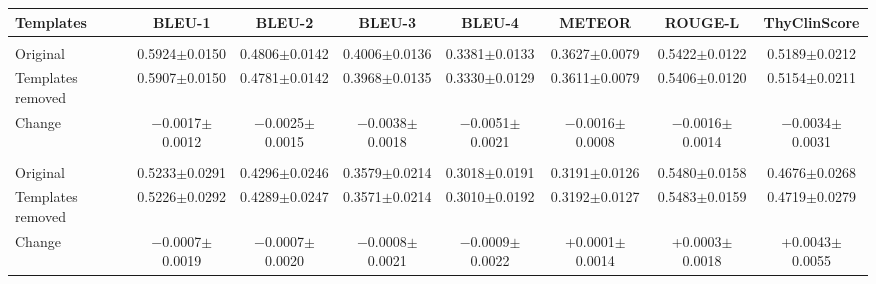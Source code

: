 \begin{responsetable}
\caption{}
\begin{adjustbox}{max width=\textwidth,center}
{\scriptsize\setlength{\tabcolsep}{3pt}
\begin{tabular}{@{}lccccccc@{}}
\toprule
\textbf{Templates} & \textbf{BLEU-1} & \textbf{BLEU-2} & \textbf{BLEU-3} & \textbf{BLEU-4} & \textbf{METEOR} & \textbf{ROUGE-L} & \textbf{ThyClinScore} \\
\midrule
\rowcolor{ResponseTableGray}\multicolumn{8}{c}{\textbf{SMU-HMC (n = 400)}} \\
Original & 0.5924$\pm$0.0150 & 0.4806$\pm$0.0142 & 0.4006$\pm$0.0136 & 0.3381$\pm$0.0133 & 0.3627$\pm$0.0079 & 0.5422$\pm$0.0122 & 0.5189$\pm$0.0212 \\
Templates removed & 0.5907$\pm$0.0150 & 0.4781$\pm$0.0142 & 0.3968$\pm$0.0135 & 0.3330$\pm$0.0129 & 0.3611$\pm$0.0079 & 0.5406$\pm$0.0120 & 0.5154$\pm$0.0211 \\
Change & $-$0.0017$\pm$0.0012 & $-$0.0025$\pm$0.0015 & $-$0.0038$\pm$0.0018 & $-$0.0051$\pm$0.0021 & $-$0.0016$\pm$0.0008 & $-$0.0016$\pm$0.0014 & $-$0.0034$\pm$0.0031 \\
\rowcolor{ResponseTableGray}\multicolumn{8}{c}{\textbf{ZJH-TS (n = 150)}} \\
Original & 0.5233$\pm$0.0291 & 0.4296$\pm$0.0246 & 0.3579$\pm$0.0214 & 0.3018$\pm$0.0191 & 0.3191$\pm$0.0126 & 0.5480$\pm$0.0158 & 0.4676$\pm$0.0268 \\
Templates removed & 0.5226$\pm$0.0292 & 0.4289$\pm$0.0247 & 0.3571$\pm$0.0214 & 0.3010$\pm$0.0192 & 0.3192$\pm$0.0127 & 0.5483$\pm$0.0159 & 0.4719$\pm$0.0279 \\
Change & $-$0.0007$\pm$0.0019 & $-$0.0007$\pm$0.0020 & $-$0.0008$\pm$0.0021 & $-$0.0009$\pm$0.0022 & +0.0001$\pm$0.0014 & +0.0003$\pm$0.0018 & +0.0043$\pm$0.0055 \\
\bottomrule
\end{tabular}}
\end{adjustbox}
\end{responsetable}
